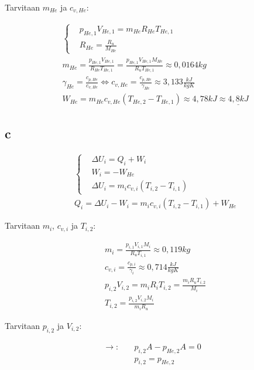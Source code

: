 \documentclass[12pt,a4paper,finnish]{article}
\begin{document}
Tarvitaan $m_{He}$ ja $c_{v, He}$:

\begin{align}
 &\left\{
  \begin{aligned}
    &p_{He,1}V_{He, 1} = m_{He}R_{He}T_{He, 1}\\
    &R_{He} = \frac{R_u}{M_{He}}
  \end{aligned}\right.\\
 &m_{He} = \frac{p_{He, 1}V_{He, 1}}{R_{He}T_{He, 1}} = \frac{p_{He, 1}V_{He, 1}M_{He}}{R_uT_{He, 1}} \approx 0,0164 kg\\
  &\gamma_{He} = \frac{c_{p, He}}{c_{v, He}} \Leftrightarrow c_{v, He} = \frac{c_{p, He}}{\gamma_{He}} \approx 3,133 \frac{kJ}{kgK}\\
 &W_{He} = m_{He}c_{v, He}(T_{He, 2} - T_{He, 1}) \approx 4,78 kJ \approx \underline{4,8 kJ}
\end{align}

\subsection{c}

\begin{align}
 &\left\{
 \begin{aligned}
  &\Delta U_i = Q_i + W_i\\
  &W_i = -W_{He}\\
  &\Delta U_i = m_ic_{v, i}(T_{i, 2} - T_{i, 1})
 \end{aligned}\right.\\
 &Q_i = \Delta U_i - W_i = m_ic_{v, i}(T_{i, 2} - T_{i, 1}) + W_{He}
\end{align}

Tarvitaan $m_i$, $c_{v, i}$ ja $T_{i, 2}$:

\begin{align}
 &m_i = \frac{p_{i, 1}V_{i, 1}M_{i}}{R_uT_{i, 1}} \approx 0,119 kg\\
  &c_{v, i} = \frac{c_{p, i}}{\gamma_i} \approx 0,714 \frac{kJ}{kgK}\\
  &p_{i,2}V_{i, 2} = m_iR_iT_{i, 2} = \frac{m_iR_uT_{i, 2}}{M_i}\\
  &T_{i, 2} = \frac{p_{i,2}V_{i, 2}M_i}{m_iR_u}
\end{align}

Tarvitaan $p_{i,2}$ ja  $V_{i, 2}$:

\begin{align}
 \rightarrow: \quad &p_{i,2}A - p_{He,2}A = 0\\
 &p_{i,2} = p_{He,2}
\end{align}
\end{document}

